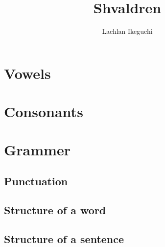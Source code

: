 \documentclass{article}
\title{Shvaldren}
\author{Lachlan Ikeguchi}
\begin{document}
\maketitle
\tableofcontents


\section{Vowels}


\section{Consonants}


\section{Grammer}
\subsection{Punctuation}


\subsection{Structure of a word}


\subsection{Structure of a sentence}
\end{document}
